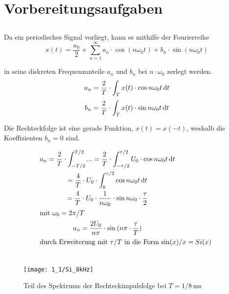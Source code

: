 \documentclass[a4paper, 12pt]{article}
\begin{document}
  
  \clearpage
  \setcounter{page}{1}

\section{Vorbereitungsaufgaben}

\subsection{}

Da ein periodisches Signal vorliegt, kann es mithilfe der
Fourierreihe
\[
x(t) = \frac{a_0}{2} + \sum_{n=1}^{\infty}{a_n \cdot \cos{(n \omega_0 t)} + b_n \cdot \sin{(n \omega_0 t)}} 
\]

in seine diskreten Frequenzanteile $a_n$ und $b_n$ bei $n \cdot \omega_0$ zerlegt werden.
\[
a_n = \frac{2}{T} \cdot \int_T{x(t) \cdot \cos{n \omega_0 t} \mathop{}\!\mathrm{d} t}
\]
\[
b_n = \frac{2}{T} \cdot \int_T{x(t) \cdot \sin{n \omega_0 t} \mathop{}\!\mathrm{d} t}
\]

\noindent Die Rechteckfolge ist eine gerade Funktion, $x(t)=x(-t)$, weshalb die Koeffizienten $b_n = 0$ sind.

\begin{gather*}
  a_n = \frac{2}{T} \cdot \int_{-T/2}^{T/2}{...} 
  = \frac{2}{T} \cdot \int_{-\tau/2}^{\tau/2}{U_0 \cdot \cos{n \omega_0 t}
    \mathop{}\!\mathrm{d} t}\\
  = \frac{4}{T} \cdot U_0 \cdot \int_{0}^{\tau/2}{\cos{n \omega_0 t} \mathop{}\!\mathrm{d} t}\\
  = \frac{4}{T} \cdot U_0 \cdot \frac{1}{n \omega_0} \cdot \sin{n \omega_0 \cdot \frac{\tau}{2}}\\
  \intertext{mit $\omega_0 = 2 \pi / T$}
  a_n = \frac{2 U_0}{n \pi} \cdot \sin{(n \pi \cdot \frac{\tau}{T})}\\
  \intertext{durch Erweiterung mit $\tau/T$ in die Form $\sin(x)/x = Si(x)$ }\\
\end{gather*}


\begin{figure}[H]
	\texttt{[image: 1\_1/Si\_8kHz]}
  \caption{Teil des Spektrums der Rechteckimpulsfolge bei $T=1/8\,\si{\milli\second}$}
\end{figure}
\end{document}

